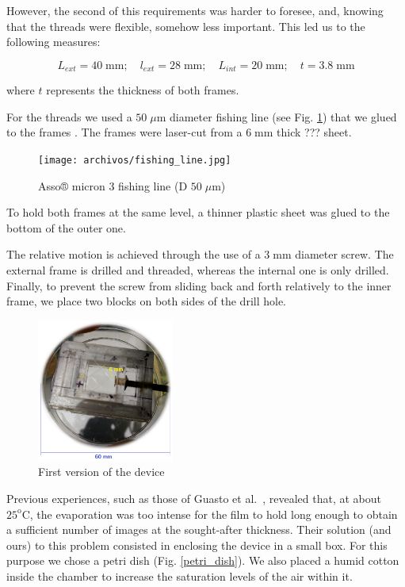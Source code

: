 However, the second of this requirements was harder to foresee, and, knowing that the threads were flexible, somehow less important. This led us to the following measures:

\begin{equation}
	L_{ext} = 40 \; \textrm{mm}; \quad l_{ext} = 28 \; \textrm{mm}; \quad L_{int} = 20 \; \textrm{mm}; \quad t = 3.8 \; \textrm{mm}
\end{equation}

where $t$ represents the thickness of both frames.

For the threads we used a $50 \; \mu \textrm{m}$ diameter fishing line (see Fig. \ref{fishing_line}) that we glued to the frames . The frames were laser-cut from a $6 \; \textrm{mm}$ thick ??? sheet.

\begin{figure}[H]
	\centering
	\texttt{[image: archivos/fishing\_line.jpg]}
	\caption{Asso® micron 3 fishing line (D $50 \; \mu \textrm{m}$)}
	\label{fishing_line}
\end{figure}

To hold both frames at the same level, a thinner plastic sheet was glued to the bottom of the outer one.

The relative motion is achieved through the use of a $3 \; \textrm{mm}$ diameter screw. The external frame is drilled and threaded, whereas the internal one is only drilled. Finally, to prevent the screw from sliding back and forth relatively to the inner frame, we place two blocks on both sides of the drill hole.   

\begin{figure}[H]
	\centering
	\includegraphics[width=0.4\textwidth]{archivos/device.png}
	\caption{First version of the device}
	\label{device}
\end{figure}

Previous experiences, such as those of Guasto et al.~\cite{Guasto}, revealed that, at about $25^\textrm{o}\textrm{C}$, the evaporation was too intense for the film to hold long enough to obtain a sufficient number of images at the sought-after thickness. Their solution (and ours) to this problem consisted in enclosing the device in a small box. For this purpose we chose a petri dish (Fig. \ref{petri_dish}). We also placed a humid cotton inside the chamber to increase the saturation levels of the air within it.

